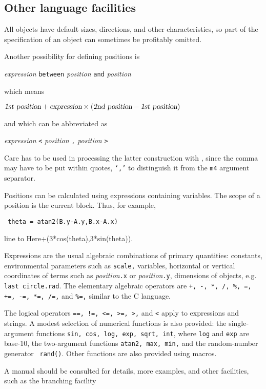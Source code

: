 \subsection{Other language facilities\label{Otherlanguage:}}

All objects have default sizes, directions, and other characteristics,
so part of the specification of an object can sometimes be profitably
omitted.

Another possibility for defining positions is 

{\sl expression} {\tt between} {\sl position}
 {\tt and} {\sl position}

\noindent%
which means 

$\hbox{\sl 1st position} + \hbox{\sl expression} \times 
  (\hbox{\sl 2nd position} - \hbox{\sl 1st position})$

\noindent and which can be abbreviated as

{\sl expression} {\tt <} {\sl position} {\tt ,} {\sl position} {\tt >}

\noindent%
Care has to be used in processing the latter construction with \Mfour,
since the comma may have to be put within quotes, {\tt `,'}
to distinguish it from the {\tt m4} argument separator.

Positions can be calculated using expressions containing variables.
The scope of a position is the current block.  Thus, for example,

{\tt
  theta = atan2(B.y-A.y,B.x-A.x)

  line to Here+(3*cos(theta),3*sin(theta)).
  }

Expressions are the usual algebraic combinations of primary quantities:
constants, environmental parameters such as {\tt scale,} variables,
horizontal or vertical coordinates of terms such as
{\sl position}{\tt.x} or {\sl position}{\tt.y},
dimensions of \pic objects, e.g. {\tt last circle.rad}.
The elementary algebraic operators are
{\tt +, -, *, /, \%, =, +=, -=, *=, /=,} and {\tt \%=,}
similar to the C language.

The logical operators {\tt ==, !=, <=, >=, >,} and {\tt <} apply to
expressions and strings.  A modest selection of numerical functions is
also provided: the single-argument functions {\tt sin, cos, log, exp,
sqrt, int}, where {\tt log} and {\tt exp} are base-10, the two-argument
functions {\tt atan2, max, min,} and the random-number generator {\tt
rand()}.  Other functions are also provided using macros.

A \pic manual should be consulted for details, more examples, and
other facilities, such as the branching facility

